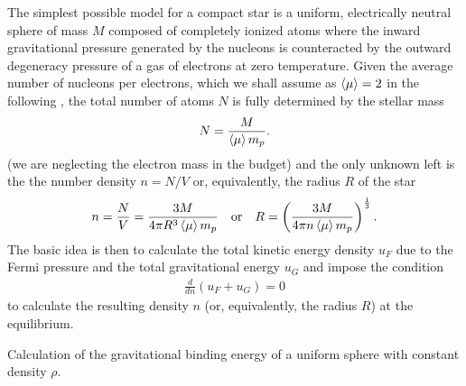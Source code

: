 The simplest possible model for a compact star is a uniform, electrically
neutral sphere of mass $M$ composed of completely ionized atoms where the inward
gravitational pressure generated by the nucleons is counteracted by the outward
degeneracy pressure of a gas of electrons at zero temperature.
Given the average number of nucleons per electrons, which we shall assume as
$\left<\mu\right> = 2$ in the following%
,
the total number of atoms $N$ is fully determined by the stellar mass
\begin{align}
  N = \frac{M}{\left<\mu\right> m_p}.
\end{align}
(we are neglecting the electron mass in the budget) and the only unknown left is
the the number density $n = N/V$ or, equivalently, the radius $R$ of the star
\begin{align}\label{eq:wd_radius_density}
  n = \frac{N}{V} = \frac{3M}{4\pi R^3 \left<\mu\right> m_p} \quad\text{or}\quad
  R = \left( \frac{3M}{4\pi n \left<\mu\right> m_p} \right)^{\frac{1}{3}}.
\end{align}
The basic idea is then to calculate the total kinetic energy density $u_F$ due to the
Fermi pressure and the total gravitational energy $u_G$
and impose the condition
\begin{align}\label{eq:wd_equilibrium_condition}
  \frac{d}{dn} (u_F + u_G) = 0
\end{align}
to calculate the resulting density $n$ (or, equivalently, the radius $R$) at the
equilibrium.

\begin{marginfigure}
  
  \caption{Calculation of the gravitational binding energy of a uniform sphere
    with constant density $\rho$.}
  \label{fig:sphere_gravitational_energy}
\end{marginfigure}

